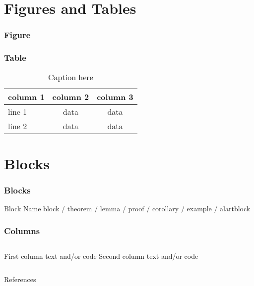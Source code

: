 \section{Figures and Tables}
\begin{frame}
  \frametitle{Figure}
  \end{frame}

\begin{frame}
  \frametitle{Table}
  \begin{table}[tb]
    \centering
    \caption{Caption here\label{tab:tablename}}
    \begin{tabular}{l|cc} \hline
    \textbf{column 1} & \textbf{column 2} & \textbf{column 3} \\ \hline
    line 1 & data & data \\ \hline
    line 2 & data & data \\ \hline
    \end{tabular}
    \end{table}
  \end{frame}
\section{Blocks}
\begin{frame}
  \frametitle{Blocks}
  \begin{block}{Block Name}
    block / theorem / lemma / proof / corollary / example / alartblock
  \end{block}
  \end{frame}

\begin{frame}
  \frametitle{Columns}
  \begin{columns}
    First column text and/or code
    Second column text and/or code
    \end{columns}
\end{frame}

\begin{frame}[allowframebreaks]{References}
  
  
\end{frame}